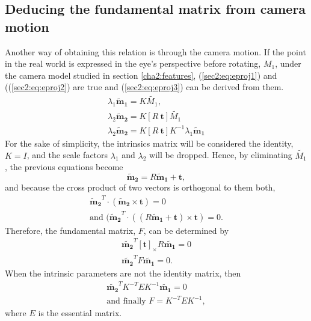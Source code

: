 \subsection{Deducing the fundamental matrix from camera motion}
Another way of obtaining this relation is through the camera motion.
If the point in the real world is expressed in the eye's perspective before rotating, $M_1$, under the camera model studied in section \ref{cha2:features}, (\ref{sec2:eq:eproj1}) and ((\ref{sec2:eq:eproj2}) are true and (\ref{sec2:eq:eproj3}) can be derived from them.
\begin{align}
\label{sec2:eq:eproj1}
\lambda_1 \mathbf{\tilde{m}_1} = K \tilde{M_1}, \\
\label{sec2:eq:eproj2}
\lambda_2 \mathbf{\tilde{m}_2} = K [ R \ \mathbf{t} ] \tilde{M_1}\\
\label{sec2:eq:eproj3}
\lambda_2 \mathbf{\tilde{m}_2} = K [ R \ \mathbf{t} ] K^{-1} \lambda_1 \mathbf{\tilde{m}_1}
\end{align}
For the sake of simplicity, the intrinsics matrix will be considered the identity, $K= I$, and the scale factors $\lambda_1$ and $\lambda_2$ will be dropped. Hence, by eliminating $\tilde{M_1}$, the previous equations become
\begin{equation}
\label{sec2:eq:elimp}
\mathbf{\tilde{m}_2} = R   \mathbf{\tilde{m}_1} + \mathbf{t},
\end{equation}
and because the cross product of two vectors is orthogonal to them both,  
\begin{align}
	\label{sec2:eq:fundm1}
	\mathbf{\tilde{m}_2}^T \cdot ( \mathbf{\tilde{m}_2} \times \mathbf{t}) = 0 \\
	\label{sec2:eq:fundm2}
	\text{and } ( \mathbf{\tilde{m}_2}^T\cdot((R  \mathbf{\tilde{m}_1} + \mathbf{t}) \times \mathbf{t}) = 0.
\end{align}
Therefore, the fundamental matrix, $F$, can be determined by 
\begin{equation}
\label{sec2:eq:fundm3}
\begin{aligned}
\mathbf{\tilde{m_2}}^T [\mathbf{t}]_\times R \mathbf{\tilde{m_1}} = 0 \\
\mathbf{\tilde{m_2}}^T F \mathbf{\tilde{m_1}} = 0.
\end{aligned}
\end{equation}
When the intrinsic parameters are not the identity matrix, then 
\begin{equation}
\begin{aligned}
\label{hhh}
\mathbf{\tilde{m_2}}^T K^{-T} E K^{-1} \mathbf{\tilde{m_1}} = 0 \\
\text{and finally }
F = K^{-T}  E K^{-1},
\end{aligned}
\end{equation}
where $E$ is the essential matrix.

